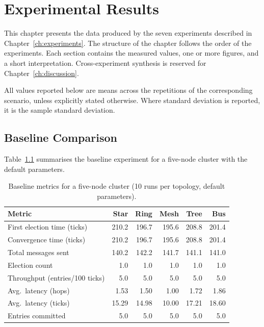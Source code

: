 \chapter{Experimental Results}
\label{ch:results}

This chapter presents the data produced by the seven experiments described in Chapter~\ref{ch:experiments}. The structure of the chapter follows the order of the experiments. Each section contains the measured values, one or more figures, and a short interpretation. Cross-experiment synthesis is reserved for Chapter~\ref{ch:discussion}.

All values reported below are means across the repetitions of the corresponding scenario, unless explicitly stated otherwise. Where standard deviation is reported, it is the sample standard deviation.

\section{Baseline Comparison}

Table~\ref{tab:exp1_baseline} summarises the baseline experiment for a five-node cluster with the default parameters.

\begin{table}[H]
\centering
\caption{Baseline metrics for a five-node cluster (10 runs per topology, default parameters).}
\label{tab:exp1_baseline}
\small
\begin{tabular}{lrrrrr}
\toprule
\textbf{Metric} & \textbf{Star} & \textbf{Ring} & \textbf{Mesh} & \textbf{Tree} & \textbf{Bus} \\
\midrule
First election time (ticks) & 210.2 & 196.7 & 195.6 & 208.8 & 201.4 \\
Convergence time (ticks)    & 210.2 & 196.7 & 195.6 & 208.8 & 201.4 \\
Total messages sent         & 140.2 & 142.2 & 141.7 & 141.1 & 141.0 \\
Election count              & 1.0   & 1.0   & 1.0   & 1.0   & 1.0   \\
Throughput (entries/100 ticks) & 5.0 & 5.0 & 5.0 & 5.0 & 5.0 \\
Avg.\ latency (hops)        & 1.53 & 1.50 & 1.00 & 1.72 & 1.86 \\
Avg.\ latency (ticks)       & 15.29 & 14.98 & 10.00 & 17.21 & 18.60 \\
Entries committed           & 5.0  & 5.0  & 5.0  & 5.0  & 5.0  \\
\bottomrule
\end{tabular}
\end{table}


